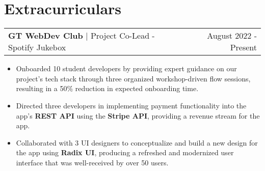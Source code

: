 \documentclass[letterpaper,11pt]{article}
\makeatletter
\newcommand{\resumeExperienceHeading}[3]{
    \begin{tabular*}{0.99\textwidth}[t]{l@{\extracolsep{\fill}}r}
      \textbf{#1} $\vert$ {#2} & {#3} \\
    \end{tabular*}\vspace{-3pt}
}
\newcommand{\resumeItemListStart}{\begin{itemize}[noitemsep]\vspace{-4pt}}
\newcommand{\resumeItemListEnd}{\end{itemize}}
\makeatother
\begin{document}
\section{Extracurriculars}
  \resumeExperienceHeading{GT WebDev Club}{Project Co-Lead - Spotify Jukebox}{August 2022 - Present}
    \resumeItemListStart
      \item {Onboarded 10 student developers by providing expert guidance on our project's tech stack through three organized workshop-driven flow sessions, resulting in a 50\% reduction in expected onboarding time.}
      \item {Directed three developers in implementing payment functionality into the app's \textbf{REST API} using the \textbf{Stripe API}, providing a revenue stream for the app.}
      \item {Collaborated with 3 UI designers to conceptualize and build a new design for the app using \textbf{Radix UI}, producing a refreshed and modernized user interface that was well-received by over 50 users.}
    \resumeItemListEnd
\end{document}
